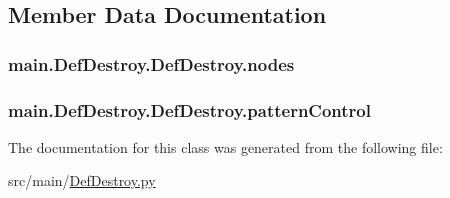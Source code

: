 \subsection{Member Data Documentation}
\hypertarget{classmain_1_1_def_destroy_1_1_def_destroy_a44f68acb30b8049dbeb8090d2851b258}{
\subsubsection[{nodes}]{\setlength{\rightskip}{0pt plus 5cm}main.\-Def\-Destroy.\-Def\-Destroy.\-nodes}}\label{classmain_1_1_def_destroy_1_1_def_destroy_a44f68acb30b8049dbeb8090d2851b258}
\hypertarget{classmain_1_1_def_destroy_1_1_def_destroy_a8e3eee7bf6fc8ec5afeef74a9bbfa558}{
\subsubsection[{pattern\-Control}]{\setlength{\rightskip}{0pt plus 5cm}main.\-Def\-Destroy.\-Def\-Destroy.\-pattern\-Control}}\label{classmain_1_1_def_destroy_1_1_def_destroy_a8e3eee7bf6fc8ec5afeef74a9bbfa558}


The documentation for this class was generated from the following file\-:\begin{DoxyCompactItemize}
\item 
src/main/\hyperlink{_def_destroy_8py}{Def\-Destroy.\-py}\end{DoxyCompactItemize}
